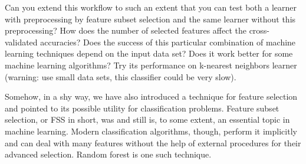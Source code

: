 
Can you extend this workflow to such an extent that you can test both a learner with preprocessing by feature subset selection and the same learner without this preprocessing? How does the number of selected features affect the cross-validated accuracies? Does the success of this particular combination of machine learning techniques depend on the input data set? Does it work better for some machine learning algorithms? Try its performance on k-nearest neighbors learner (warning: use small data sets, this classifier could be very slow).

%
Somehow, in a shy way, we have also introduced a technique for feature selection and pointed to its possible utility for classification problems. Feature subset selection, or FSS in short, was and still is, to some extent, an essential topic in machine learning. Modern classification algorithms, though, perform it implicitly and can deal with many features without the help of external procedures for their advanced selection. Random forest is one such technique.